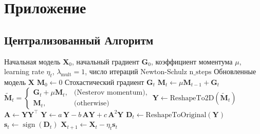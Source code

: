 \documentclass{article}
\begin{document}
\section{Приложение}

\subsection{Централизованный Алгоритм}\label{app:central_alg}
\begin{algorithm}
\caption{SignMuon}
\begin{algorithmic}[1]
\Require Начальная модель $\mathbf{X}_0$, начальный градиент $\mathbf{G}_0$, коэффициент моментума $\mu$, learning rate $\eta_t$, $\lambda_{\mathrm{mult}}=1$, число итераций Newton-Schulz $\mathrm{n\_steps}$
\Ensure Обновленные модель $\mathbf{X}$
\State $\mathbf{M}_0 \gets 0$ 
    \State Стохастический градиент $\mathbf{G}_t$
    \State $\mathbf{M}_t \gets \mu \mathbf{M}_{t-1} + \mathbf{G}_t$ 
    \State $\tilde{\mathbf{M}}_t =
    \begin{cases} 
        \mathbf{G}_t + \mu \mathbf{M}_t, & \text{(Nesterov momentum)}, \\
        \mathbf{M}_t, & \text{(otherwise)}
    \end{cases}$
    \State $\mathbf{Y} \gets \text{ReshapeTo2D}(\tilde{\mathbf{M}}_t)$ 
     
        \State $\mathbf{A} \gets \mathbf{Y} \mathbf{Y}^\top$
        \State $\mathbf{Y} \gets a\,\mathbf{Y} - b\,\mathbf{A}\mathbf{Y} + c\,\mathbf{A}^2\mathbf{Y}$
    \EndFor
    \State $\mathbf{D}_t \gets \text{ReshapeToOriginal}(\mathbf{Y})$ 
    \State $\mathbf{s}_t \gets \operatorname{sign}(\mathbf{D}_t)$ 
    \State $\mathbf{X}_{t+1} \gets \mathbf{X}_t - \eta_t \mathbf{s}_t$ 
\EndFor
\label{central_alg}
\end{algorithmic}
\end{algorithm}
\end{document}
